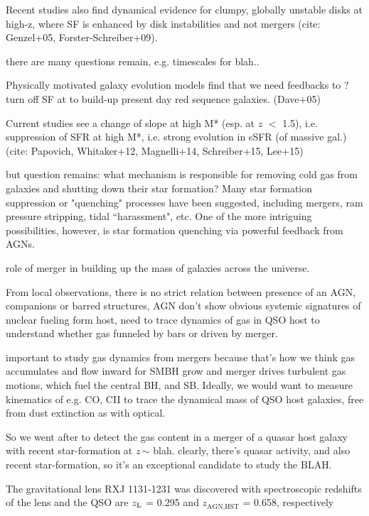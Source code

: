 Recent studies also find dynamical evidence for clumpy, globally unstable disks at high-z, 
where SF is enhanced by disk instabilities and not mergers (cite: Genzel+05, Forster-Schreiber+09).

there are many questions remain, e.g. timescales for blah..

Physically motivated galaxy evolution models find that we need feedbacks to ? turn off SF at to build-up present day red 
sequence galaxies. (Dave+05)

Current studies see a change of slope at high M* (esp. at $z$ $<$ 1.5),  i.e. suppression of SFR at high M*, i.e. strong evolution in 
sSFR (of massive gal.) (cite: Papovich, Whitaker+12, Magnelli+14, Schreiber+15, Lee+15)

but question remains: what mechanism is responsible for removing cold gas from galaxies and shutting down their star 
formation? Many star formation suppression or "quenching" processes have been suggested, including mergers, ram 
pressure stripping, tidal ``harassment", etc. One of the more intriguing possibilities, however, is star 
formation quenching via powerful feedback from AGNs.

role of merger in building up the mass of galaxies across the universe.

From local observations, there is no strict relation between presence of an AGN, companions or barred structures, AGN don't 
show obvious systemic signatures of nuclear fueling form host, need to trace dynamics of gas in QSO host to understand 
whether gas funneled by bars or driven by merger.
   
important to study gas dynamics from mergers because that's how we think gas accumulates and flow inward for SMBH grow
and merger drives turbulent gas motions, which fuel the central BH, and SB. 
Ideally, we would want to measure kinematics of e.g. CO, CII to trace the dynamical mass of QSO 
host galaxies, free from dust extinction as with optical.

So we went after to detect the gas content in a merger of a quasar host galaxy with recent star-formation at $z$\,$\sim$ blah. 
clearly, there's quasar activity, and also recent star-formation, so it's an exceptional candidate to study the BLAH.


The gravitational lens RXJ 1131-1231 was discovered with spectroscopic
redshifts of the lens and the QSO are $z_{\rm L}$ = 0.295 and
$z_\textrm{AGN,HST}$ =
0.658, respectively \citep{Sluse03a}

